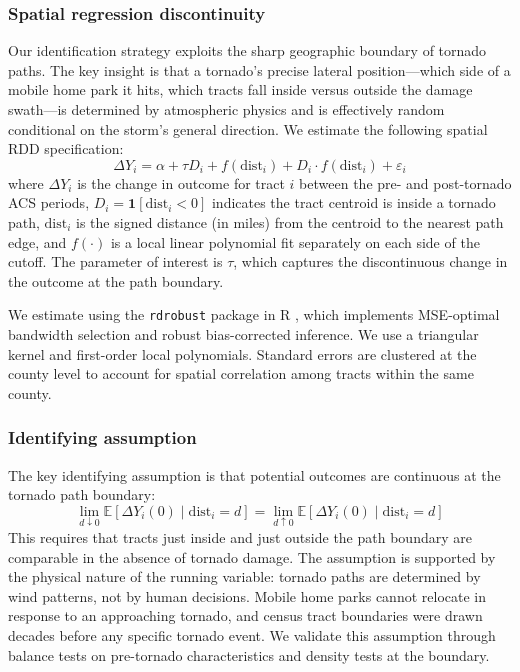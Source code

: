 \documentclass[12pt]{article}
\newcommand{\E}{\mathbb{E}}
\begin{document}
\subsubsection*{Spatial regression discontinuity} Our identification strategy exploits the sharp geographic boundary of tornado paths. The key insight is that a tornado's precise lateral position---which side of a mobile home park it hits, which tracts fall inside versus outside the damage swath---is determined by atmospheric physics and is effectively random conditional on the storm's general direction. We estimate the following spatial RDD specification:
\begin{equation}
\Delta Y_i = \alpha + \tau D_i + f(\text{dist}_i) + D_i \cdot f(\text{dist}_i) + \varepsilon_i
\label{eq:rdd}
\end{equation}
where $\Delta Y_i$ is the change in outcome for tract $i$ between the pre- and post-tornado ACS periods, $D_i = \mathbf{1}[\text{dist}_i < 0]$ indicates the tract centroid is inside a tornado path, $\text{dist}_i$ is the signed distance (in miles) from the centroid to the nearest path edge, and $f(\cdot)$ is a local linear polynomial fit separately on each side of the cutoff. The parameter of interest is $\tau$, which captures the discontinuous change in the outcome at the path boundary.

We estimate  using the \texttt{rdrobust} package in R \citep{cattaneo2014robust}, which implements MSE-optimal bandwidth selection and robust bias-corrected inference. We use a triangular kernel and first-order local polynomials. Standard errors are clustered at the county level to account for spatial correlation among tracts within the same county.

\subsubsection*{Identifying assumption} The key identifying assumption is that potential outcomes are continuous at the tornado path boundary:
\begin{equation}
\lim_{d \downarrow 0} \E[\Delta Y_i(0) \mid \text{dist}_i = d] = \lim_{d \uparrow 0} \E[\Delta Y_i(0) \mid \text{dist}_i = d]
\end{equation}
This requires that tracts just inside and just outside the path boundary are comparable in the absence of tornado damage. The assumption is supported by the physical nature of the running variable: tornado paths are determined by wind patterns, not by human decisions. Mobile home parks cannot relocate in response to an approaching tornado, and census tract boundaries were drawn decades before any specific tornado event. We validate this assumption through balance tests on pre-tornado characteristics and density tests at the boundary.
\end{document}
